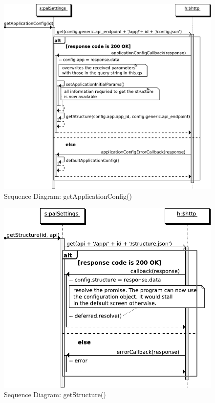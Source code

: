 \begin{figure}[htb]
    \centering
    \includegraphics{figures/design/seqdia/palSettings-getApplicationConfig.pdf}
    \caption{Sequence Diagram: getApplicationConfig()}
    \label{fig:design-seqdia-palSettings-getApplicationConfig}
\end{figure}


\begin{figure}[htb]
    \centering
    \includegraphics{figures/design/seqdia/palSettings-getStructure.pdf}
    \caption{Sequence Diagram: getStructure()}
    \label{fig:design-seqdia-palSettings-getStructure}
\end{figure}

